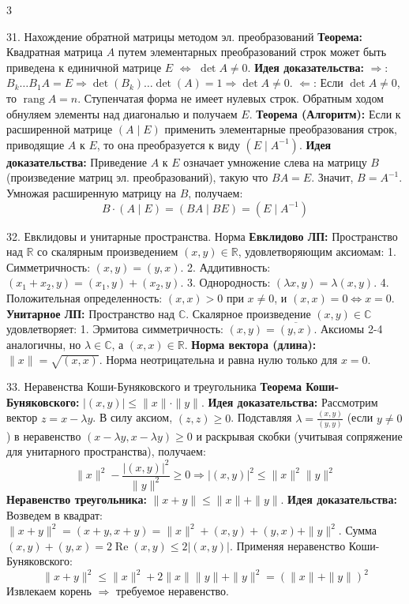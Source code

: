\documentclass[8pt, a4paper, landscape]{extarticle}
\newcommand{\Ra}{\Rightarrow}
\begin{document}
\begin{multicols*}{3}
\begin{ticket}{31. Нахождение обратной матрицы методом эл. преобразований}
\textbf{Теорема:} Квадратная матрица $A$ путем элементарных преобразований строк может быть приведена к единичной матрице $E$ $\Leftrightarrow$ $\det A \neq 0$.
\textbf{Идея доказательства:} 
$\Rightarrow$: $B_k \dots B_1 A = E \Ra \det(B_k)\dots\det(A) = 1 \Ra \det A \neq 0$. 
$\Leftarrow$: Если $\det A \neq 0$, то $\operatorname{rang} A = n$. Ступенчатая форма не имеет нулевых строк. Обратным ходом обнуляем элементы над диагональю и получаем $E$.
\tcblower
\textbf{Теорема (Алгоритм):} Если к расширенной матрице $(A \mid E)$ применить элементарные преобразования строк, приводящие $A$ к $E$, то она преобразуется к виду $(E \mid A^{-1})$.
\textbf{Идея доказательства:} 
Приведение $A$ к $E$ означает умножение слева на матрицу $B$ (произведение матриц эл. преобразований), такую что $BA = E$. Значит, $B = A^{-1}$. 
Умножая расширенную матрицу на $B$, получаем:
\[B \cdot (A \mid E) = (BA \mid BE) = (E \mid A^{-1})\]
\end{ticket}

\begin{ticket}{32. Евклидовы и унитарные пространства. Норма}
\textbf{Евклидово ЛП:} Пространство над $\mathbb{R}$ со скалярным произведением $(x, y) \in \mathbb{R}$, удовлетворяющим аксиомам:
1. Симметричность: $(x, y) = (y, x)$.
2. Аддитивность: $(x_1 + x_2, y) = (x_1, y) + (x_2, y)$.
3. Однородность: $(\lambda x, y) = \lambda (x, y)$.
4. Положительная определенность: $(x, x) > 0$ при $x \neq 0$, и $(x, x) = 0 \iff x = 0$.
\tcblower
\textbf{Унитарное ЛП:} Пространство над $\mathbb{C}$. Скалярное произведение $(x, y) \in \mathbb{C}$ удовлетворяет:
1. Эрмитова симметричность: $(x, y) = \overline{(y, x)}$.
Аксиомы 2-4 аналогичны, но $\lambda \in \mathbb{C}$, а $(x, x) \in \mathbb{R}$.
\textbf{Норма вектора (длина):} $\|x\| = \sqrt{(x, x)}$. 
Норма неотрицательна и равна нулю только для $x = 0$.
\end{ticket}

\begin{ticket}{33. Неравенства Коши-Буняковского и треугольника}
\textbf{Теорема Коши-Буняковского:} $|(x, y)| \le \|x\| \cdot \|y\|$.
\textbf{Идея доказательства:} Рассмотрим вектор $z = x - \lambda y$. В силу аксиом, $(z, z) \ge 0$. Подставляя $\lambda = \frac{(x, y)}{(y, y)}$ (если $y \neq 0$) в неравенство $(x - \lambda y, x - \lambda y) \ge 0$ и раскрывая скобки (учитывая сопряжение для унитарного пространства), получаем:
\[\|x\|^2 - \frac{|(x, y)|^2}{\|y\|^2} \ge 0 \Ra |(x, y)|^2 \le \|x\|^2 \|y\|^2\]
\tcblower
\textbf{Неравенство треугольника:} $\|x + y\| \le \|x\| + \|y\|$.
\textbf{Идея доказательства:} 
Возведем в квадрат: $\|x + y\|^2 = (x + y, x + y) = \|x\|^2 + (x, y) + (y, x) + \|y\|^2$.
Сумма $(x, y) + (y, x) = 2 \operatorname{Re}(x, y) \le 2|(x, y)|$. 
Применяя неравенство Коши-Буняковского:
\[\|x + y\|^2 \le \|x\|^2 + 2\|x\|\|y\| + \|y\|^2 = (\|x\| + \|y\|)^2\]
Извлекаем корень $\Ra$ требуемое неравенство.
\end{ticket}


\end{multicols*}
\end{document}
